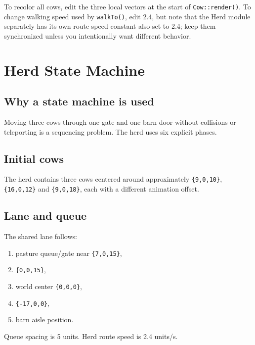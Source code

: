\documentclass[11pt,a4paper,openany]{book}
\newcommand{\code}[1]{\texttt{#1}}
\begin{document}
\begin{editbox}
	To recolor all cows, edit the three local vectors at the start of \code{Cow::render()}. To change walking speed used by \code{walkTo()}, edit 2.4, but note that the Herd module separately has its own route speed constant also set to 2.4; keep them synchronized unless you intentionally want different behavior.
\end{editbox}

\chapter{Herd State Machine}
\section{Why a state machine is used}
Moving three cows through one gate and one barn door without collisions or teleporting is a sequencing problem. The herd uses six explicit phases.

\begin{center}
\end{center}

\section{Initial cows}
The herd contains three cows centered around approximately \code{\{9,0,10\}}, \code{\{16,0,12\}} and \code{\{9,0,18\}}, each with a different animation offset.

\section{Lane and queue}
The shared lane follows:
\begin{enumerate}
	\item pasture queue/gate near \code{\{7,0,15\}},
	\item \code{\{0,0,15\}},
	\item world center \code{\{0,0,0\}},
	\item \code{\{-17,0,0\}},
	\item barn aisle position.
\end{enumerate}
Queue spacing is 5 units. Herd route speed is 2.4 units/s.
\end{document}
